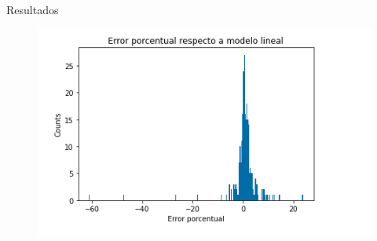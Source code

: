 \documentclass[10pt]{beamer}
\begin{document}
\begin{frame}{Resultados}
\begin{figure}
\includegraphics[scale=0.3]{img/4.png}
\end{figure}
\end{frame}
\end{document}

